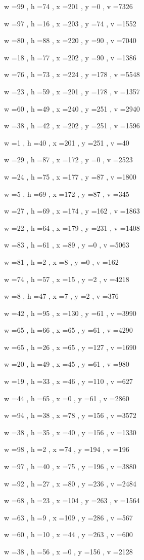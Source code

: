 \documentclass[11pt]{article}
\begin{document}
w =99 , h =74 , x =201 , y =0 , v =7326
\par
w =97 , h =16 , x =203 , y =74 , v =1552
\par
w =80 , h =88 , x =220 , y =90 , v =7040
\par
w =18 , h =77 , x =202 , y =90 , v =1386
\par
w =76 , h =73 , x =224 , y =178 , v =5548
\par
w =23 , h =59 , x =201 , y =178 , v =1357
\par
w =60 , h =49 , x =240 , y =251 , v =2940
\par
w =38 , h =42 , x =202 , y =251 , v =1596
\par
w =1 , h =40 , x =201 , y =251 , v =40
\par
w =29 , h =87 , x =172 , y =0 , v =2523
\par
w =24 , h =75 , x =177 , y =87 , v =1800
\par
w =5 , h =69 , x =172 , y =87 , v =345
\par
w =27 , h =69 , x =174 , y =162 , v =1863
\par
w =22 , h =64 , x =179 , y =231 , v =1408
\par
w =83 , h =61 , x =89 , y =0 , v =5063
\par
w =81 , h =2 , x =8 , y =0 , v =162
\par
w =74 , h =57 , x =15 , y =2 , v =4218
\par
w =8 , h =47 , x =7 , y =2 , v =376
\par
w =42 , h =95 , x =130 , y =61 , v =3990
\par
w =65 , h =66 , x =65 , y =61 , v =4290
\par
w =65 , h =26 , x =65 , y =127 , v =1690
\par
w =20 , h =49 , x =45 , y =61 , v =980
\par
w =19 , h =33 , x =46 , y =110 , v =627
\par
w =44 , h =65 , x =0 , y =61 , v =2860
\par
w =94 , h =38 , x =78 , y =156 , v =3572
\par
w =38 , h =35 , x =40 , y =156 , v =1330
\par
w =98 , h =2 , x =74 , y =194 , v =196
\par
w =97 , h =40 , x =75 , y =196 , v =3880
\par
w =92 , h =27 , x =80 , y =236 , v =2484
\par
w =68 , h =23 , x =104 , y =263 , v =1564
\par
w =63 , h =9 , x =109 , y =286 , v =567
\par
w =60 , h =10 , x =44 , y =263 , v =600
\par
w =38 , h =56 , x =0 , y =156 , v =2128
\par
\newpage
\end{document}
